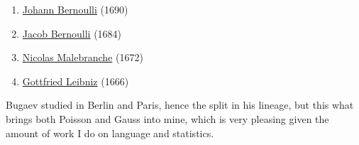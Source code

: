 \documentclass[12pt]{article}
\begin{document}
\begin{enumerate}
\item \href{https://www.genealogy.math.ndsu.nodak.edu/id.php?id=53410}{Johann Bernoulli} (1690)
\item \href{https://www.genealogy.math.ndsu.nodak.edu/id.php?id=54440}{Jacob Bernoulli} (1684)
\item \href{https://www.genealogy.math.ndsu.nodak.edu/id.php?id=143011}{Nicolas Malebranche} (1672)
\item \href{https://www.genealogy.math.ndsu.nodak.edu/id.php?id=60985}{Gottfried Leibniz} (1666)
\end{enumerate}

Bugaev studied in Berlin and Paris, hence the split in his lineage, but this what brings both Poisson and Gauss into mine, which is very pleasing given the amount of work I do on language and statistics.
\end{document}
